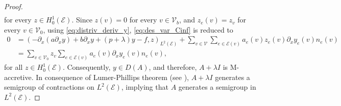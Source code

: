 \documentclass[10pt,a4paper]{amsart}
\begin{document}
\begin{proof}
\begin{align}
\end{align}
for every $z\in H^1_0(\mathcal{E})$. Since $z(v)=0$ for every $v\in \mathcal{V}_b$, and $z_e(v)=z_v$ for every $v\in\mathcal{V}_0$, using \eqref{eq:distriv_deriv_y}, \eqref{eq:des_var_Cinf} is reduced to
\begin{align*}
     0&=(-\partial_x(a\partial_x y) + b\partial_x y +(p+\lambda)y -f,z)_{L^2(\mathcal{E})}+\sum_{v\in \mathcal{V}}\sum_{e\in\mathcal{E}(v)}a_e(v)z_e(v)\partial_x y_e(v)n_e(v)\\
     &=  \sum_{v\in \mathcal{V}_0}z_v\sum_{e\in\mathcal{E}(v)} a_e(v)\partial_x y_e(v)n_e(v),
\end{align*}
for all $z\in H^1_0(\mathcal{E})$. Consequently, $y\in D(A)$, and therefore, $A+\lambda I$ is M-accretive. In consequence of Lumer-Phillips theorem (see \cite[Theorem 2.8]{Bensoussan}), $A+\lambda I$ generates a semigroup of contractions on $L^2(\mathcal{E})$, implying that $A$ generates a semigroup in $L^2(\mathcal{E})$.


\end{proof}
\end{document}
